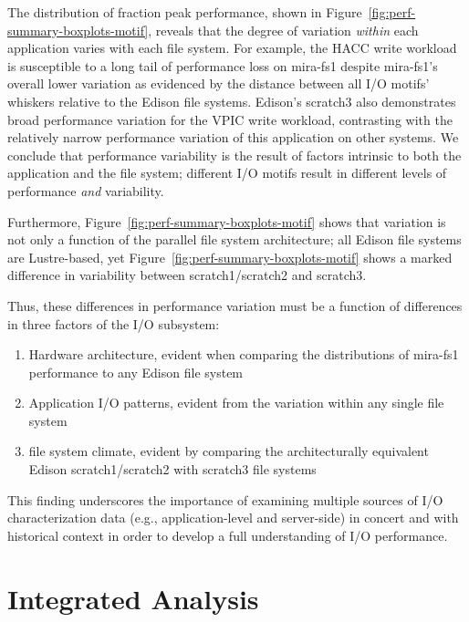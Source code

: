 The distribution of fraction peak performance, shown in Figure~\ref{fig:perf-summary-boxplots-motif}, 
reveals that the degree of variation \emph{within} each application varies with each file system.
For example, the HACC write workload is susceptible to a long tail of performance loss on mira-fs1 despite mira-fs1's overall lower variation as evidenced by the distance between all I/O motifs' whiskers relative to the Edison file systems.
Edison's scratch3 also demonstrates broad performance variation for the VPIC write workload, contrasting with the relatively narrow performance variation of this application on other systems.  We conclude that performance variability is the result of factors intrinsic to both the application and the file system;
different I/O motifs result in different levels of performance \emph{and} variability.

Furthermore, Figure~\ref{fig:perf-summary-boxplots-motif} shows that variation is not only a function of the parallel file system architecture; all Edison file systems are Lustre-based, yet Figure~\ref{fig:perf-summary-boxplots-motif} shows a marked difference in variability between scratch1/scratch2 and scratch3.

Thus, these differences in performance variation must be a function of differences in three factors of the I/O subsystem:

\begin{enumerate}[leftmargin=*]
\item Hardware architecture, evident when comparing the distributions of mira-fs1 performance to any Edison file system
\item Application I/O patterns, evident from the variation within any single file system
\item {} file system climate, evident by comparing the architecturally equivalent Edison scratch1/scratch2 with scratch3 file systems
\end{enumerate}

This finding underscores the importance of examining multiple sources of I/O characterization data (e.g., application-level and server-side) in concert and with historical context in order to develop a full understanding of I/O performance.

\section{Integrated Analysis} \label{sec:results/umami}

